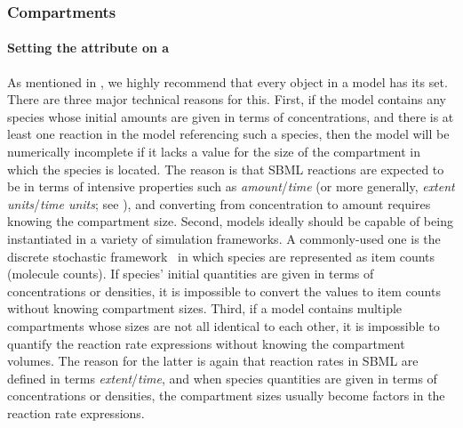 

\subsubsection{Compartments}
\label{sec:bp:compartment}


\paragraph{Setting the  attribute on a }
\label{sec:bp:size}

As mentioned in , we highly recommend that
every \Compartment object in a model has its  set.
There are three major technical reasons for this.  First, if the
model contains any species whose initial amounts are given in
terms of concentrations, and there is at least one reaction in the
model referencing such a species, then the model will be
numerically incomplete if it lacks a value for the size of the
compartment in which the species is located.  The reason is that
SBML reactions are expected to be in terms of intensive properties
such as \emph{amount}/\emph{time} (or more generally, \emph{extent
  units}/\emph{time units}; see
), and converting from
concentration to amount requires knowing the compartment size.
Second, models ideally should be capable of being instantiated in
a variety of simulation frameworks.  A commonly-used one is the
discrete stochastic
framework~\citep{gillespie:1977,wilkinson_2006} in which species
are represented as item counts (\eg molecule counts).  If species'
initial quantities are given in terms of concentrations or
densities, it is impossible to convert the values to item counts
without knowing compartment sizes.  Third, if a model contains
multiple compartments whose sizes are not all identical to each
other, it is impossible to quantify the reaction rate expressions
without knowing the compartment volumes.  The reason for the
latter is again that reaction rates in SBML are defined in terms
\emph{extent}/\emph{time}, and when species quantities are given
in terms of concentrations or densities, the compartment sizes
usually become factors in the reaction rate expressions.


